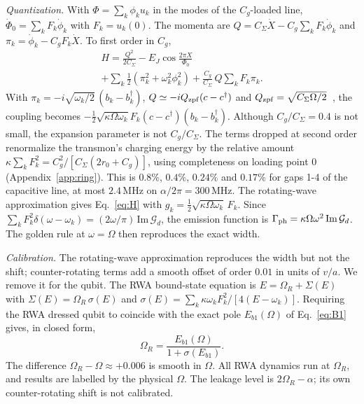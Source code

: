 \documentclass[aps,prresearch,twocolumn,superscriptaddress,nofootinbib,longbibliography,floatfix]{revtex4-2}
\newcommand{\G}{\mathcal{G}}
\begin{document}
\emph{Quantization.} With $\Phi=\sum_k\phi_ku_k$ in the modes of the $C_g$-loaded line, $\dot\Phi_0=\sum_kF_k\dot\phi_k$
with $F_k=u_k(0)$. The momenta are $Q=C_\Sigma\dot X-C_g\sum_kF_k\dot\phi_k$ and $\pi_k=\dot\phi_k-C_gF_k\dot X$. To first
order in $C_g$,
\begin{multline}
H=\frac{Q^2}{2C_\Sigma}-E_J\cos\frac{2\pi X}{\Phi_0}\\
+\sum_k\tfrac12(\pi_k^2+\omega_k^2\phi_k^2)+\frac{C_g}{C_\Sigma}\,Q\sum_kF_k\pi_k .
\end{multline}
With $\pi_k=-i\sqrt{\omega_k/2}\,(b_k-b_k^\dagger)$, $Q\simeq-iQ_{\rm zpf}(c-c^\dagger)$ and
$Q_{\rm zpf}=\sqrt{C_\Sigma\Omega/2}$~\cite{Koch2007}, the coupling becomes
$-\tfrac12\sqrt{\kappa\Omega\omega_k}F_k(c-c^\dagger)(b_k-b_k^\dagger)$. Although $C_g/C_\Sigma=0.4$ is not small, the
expansion parameter is not $C_g/C_\Sigma$. The terms dropped at second order renormalize the transmon's charging energy
by the relative amount $\kappa\sum_kF_k^2=C_g^2/[C_\Sigma(2r_0+C_g)]$, using completeness on loading point 0
(Appendix~\ref{app:ring}). This is $0.8\%$, $0.4\%$, $0.24\%$ and $0.17\%$ for gaps 1-4 of the capacitive line, at most
$2.4$\,MHz on $\alpha/2\pi=300$\,MHz. The rotating-wave approximation gives
Eq.~\eqref{eq:H} with $g_k=\tfrac12\sqrt{\kappa\Omega\omega_k}\,F_k$. Since
$\sum_kF_k^2\delta(\omega-\omega_k)=(2\omega/\pi)\,\mathrm{Im}\,\G_d$, the emission function is
$\Gamma_{\rm ph}=\kappa\Omega\omega^2\,\mathrm{Im}\,\G_d$. The golden rule at $\omega=\Omega$ then reproduces the exact width.

\emph{Calibration.} The rotating-wave approximation reproduces the width but not the shift; counter-rotating terms add a
smooth offset of order $0.01$ in units of $v/a$. We remove it for the qubit. The RWA bound-state equation is
$E=\Omega_R+\Sigma(E)$ with $\Sigma(E)=\Omega_R\,\sigma(E)$ and $\sigma(E)=\sum_k\kappa\omega_kF_k^2/[4(E-\omega_k)]$.
Requiring the RWA dressed qubit to coincide with the exact pole $E_{b1}(\Omega)$ of Eq.~\eqref{eq:B1} gives, in closed form,
\begin{equation}
\Omega_R=\frac{E_{b1}(\Omega)}{1+\sigma(E_{b1})} .
\end{equation}
The difference $\Omega_R-\Omega\approx+0.006$ is smooth in $\Omega$. All RWA dynamics run at $\Omega_R$, and results are
labelled by the physical $\Omega$. The leakage level is $2\Omega_R-\alpha$; its own counter-rotating shift is not
calibrated.

\end{document}
